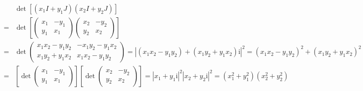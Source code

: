 \documentclass[
]{book}
\theoremstyle{definition}
\theoremstyle{definition}
\theoremstyle{definition}
\theoremstyle{definition}
\theoremstyle{remark}
\begin{document}
\[
\begin{aligned}
 & \det\left[\left(x_{{\scriptscriptstyle 1}}I+y_{{\scriptscriptstyle 1}}J\right)\left(x_{{\scriptscriptstyle 2}}I+y_{{\scriptscriptstyle 2}}J\right)\right]\\
= & \det\left[\begin{pmatrix}x_{{\scriptscriptstyle 1}} & -y_{{\scriptscriptstyle 1}}\\
y_{{\scriptscriptstyle 1}} & x_{{\scriptscriptstyle 1}}
\end{pmatrix}\begin{pmatrix}x_{{\scriptscriptstyle 2}} & -y_{{\scriptscriptstyle 2}}\\
y_{{\scriptscriptstyle 2}} & x_{{\scriptscriptstyle 2}}
\end{pmatrix}\right]\\
= & \det\begin{pmatrix}x_{{\scriptscriptstyle 1}}x_{{\scriptscriptstyle 2}}-y_{{\scriptscriptstyle 1}}y_{{\scriptscriptstyle 2}} & -x_{{\scriptscriptstyle 1}}y_{{\scriptscriptstyle 2}}-y_{{\scriptscriptstyle 1}}x_{{\scriptscriptstyle 2}}\\
x_{{\scriptscriptstyle 1}}y_{{\scriptscriptstyle 2}}+y_{{\scriptscriptstyle 1}}x_{{\scriptscriptstyle 2}} & x_{{\scriptscriptstyle 1}}x_{{\scriptscriptstyle 2}}-y_{{\scriptscriptstyle 1}}y_{{\scriptscriptstyle 2}}
\end{pmatrix}=\left|\left(x_{{\scriptscriptstyle 1}}x_{{\scriptscriptstyle 2}}-y_{{\scriptscriptstyle 1}}y_{{\scriptscriptstyle 2}}\right)+\left(x_{{\scriptscriptstyle 1}}y_{{\scriptscriptstyle 2}}+y_{{\scriptscriptstyle 1}}x_{{\scriptscriptstyle 2}}\right)\mathrm{i}\right|^{2}=\left(x_{{\scriptscriptstyle 1}}x_{{\scriptscriptstyle 2}}-y_{{\scriptscriptstyle 1}}y_{{\scriptscriptstyle 2}}\right)^{2}+\left(x_{{\scriptscriptstyle 1}}y_{{\scriptscriptstyle 2}}+y_{{\scriptscriptstyle 1}}x_{{\scriptscriptstyle 2}}\right)^{2}\\
= & \left[\det\begin{pmatrix}x_{{\scriptscriptstyle 1}} & -y_{{\scriptscriptstyle 1}}\\
y_{{\scriptscriptstyle 1}} & x_{{\scriptscriptstyle 1}}
\end{pmatrix}\right]\left[\det\begin{pmatrix}x_{{\scriptscriptstyle 2}} & -y_{{\scriptscriptstyle 2}}\\
y_{{\scriptscriptstyle 2}} & x_{{\scriptscriptstyle 2}}
\end{pmatrix}\right]=\left|x_{{\scriptscriptstyle 1}}+y_{{\scriptscriptstyle 1}}\mathrm{i}\right|^{2}\left|x_{{\scriptscriptstyle 2}}+y_{{\scriptscriptstyle 2}}\mathrm{i}\right|^{2}=\left(x_{{\scriptscriptstyle 1}}^{2}+y_{{\scriptscriptstyle 1}}^{2}\right)\left(x_{{\scriptscriptstyle 2}}^{2}+y_{{\scriptscriptstyle 2}}^{2}\right)
\end{aligned}
\]
\end{document}
